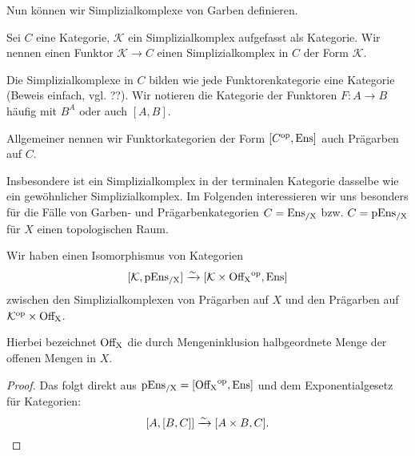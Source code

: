 Nun können wir Simplizialkomplexe von Garben definieren.

\begin{defn}
  Sei $C$ eine Kategorie, $\mathcal{K}$ ein Simplizialkomplex
  aufgefasst als Kategorie. Wir nennen einen Funktor $\mathcal{K} \to
  C$ einen Simplizialkomplex in $C$ der Form $\mathcal{K}$.
\end{defn}

Die Simplizialkomplexe in $C$ bilden wie jede Funktorenkategorie eine
Kategorie (Beweis einfach, vgl. ??). Wir notieren die Kategorie der
Funktoren $F: A \to B$ häufig mit $B^A$ oder auch $[A, B]$.

Allgemeiner nennen wir Funktorkategorien der Form $[C^\mathrm{op}, \operatorname{Ens}]$ auch
Prägarben auf $C$.

Insbesondere ist ein Simplizialkomplex in der terminalen Kategorie
dasselbe wie ein gewöhnlicher Simplizialkomplex. Im Folgenden
interessieren wir uns besonders für die Fälle von Garben- und
Prägarbenkategorien $C = \operatorname{Ens_{/X}}$ bzw. $C = \operatorname{pEns_{/X}}$ für $X$ einen
topologischen Raum.

\begin{lemma}
  Wir haben einen Isomorphismus von Kategorien
  \[
    [\mathcal{K}, \operatorname{pEns_{/X}}] \xrightarrow[]{\sim} {[\mathcal{K} \times \operatorname{Off_X}^\mathrm{op}, \operatorname{Ens}]}
  \]    
  zwischen den Simplizialkomplexen von Prägarben auf $X$ und den
  Prägarben auf $\mathcal{K}^\mathrm{op} \times \operatorname{Off_X}$.
\end{lemma}
Hierbei bezeichnet $\operatorname{Off_X}$ die durch Mengeninklusion halbgeordnete
Menge der offenen Mengen in $X$.
\begin{proof}
  Das folgt direkt aus $\operatorname{pEns_{/X}} = [\operatorname{Off_X}^\mathrm{op}, \operatorname{Ens}]$ und dem
  Exponentialgesetz für Kategorien:
  \[ [A, [B, C]] \xrightarrow[]{\sim} {[A \times B, C]}. \]
\end{proof}

